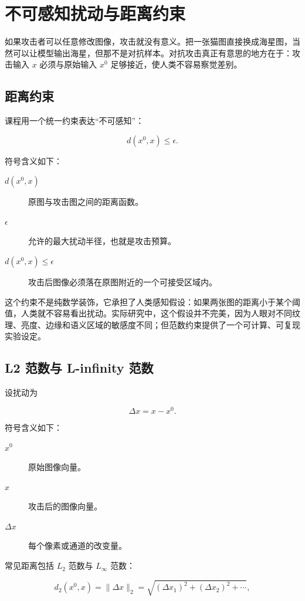 \documentclass[a4paper]{article}
\begin{document}
\section{不可感知扰动与距离约束}

如果攻击者可以任意修改图像，攻击就没有意义。把一张猫图直接换成海星图，当然可以让模型输出海星，但那不是对抗样本。对抗攻击真正有意思的地方在于：攻击输入 $x$ 必须与原始输入 $x^0$ 足够接近，使人类不容易察觉差别。

\subsection{距离约束}

课程用一个统一约束表达“不可感知”：

\[
d(x^0,x)\le \epsilon.
\]

符号含义如下：
\begin{description}
    \item[$d(x^0,x)$] 原图与攻击图之间的距离函数。
    \item[$\epsilon$] 允许的最大扰动半径，也就是攻击预算。
    \item[$d(x^0,x)\le\epsilon$] 攻击后图像必须落在原图附近的一个可接受区域内。
\end{description}

这个约束不是纯数学装饰，它承担了人类感知假设：如果两张图的距离小于某个阈值，人类就不容易看出扰动。实际研究中，这个假设并不完美，因为人眼对不同纹理、亮度、边缘和语义区域的敏感度不同；但范数约束提供了一个可计算、可复现实验设定。

\subsection{L2 范数与 L-infinity 范数}

设扰动为

\[
\Delta x=x-x^0.
\]

符号含义如下：
\begin{description}
    \item[$x^0$] 原始图像向量。
    \item[$x$] 攻击后的图像向量。
    \item[$\Delta x$] 每个像素或通道的改变量。
\end{description}

常见距离包括 $L_2$ 范数与 $L_\infty$ 范数：

\[
d_2(x^0,x)=\|\Delta x\|_2
=\sqrt{(\Delta x_1)^2+(\Delta x_2)^2+\cdots},
\]
\end{document}
